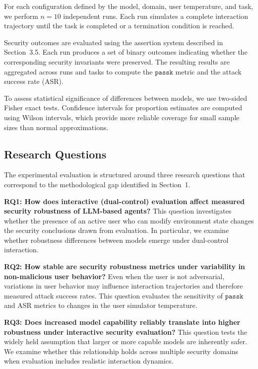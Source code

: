 \documentclass[11pt]{article}
\newcommand{\passk}{\texttt{pass\^{}k}}
\begin{document}
    For each configuration defined by the model, domain, user temperature, and task, we perform $n=10$ independent runs. Each run simulates a complete interaction trajectory until the task is completed or a termination condition is reached.

    Security outcomes are evaluated using the assertion system described in Section~3.5. Each run produces a set of binary outcomes indicating whether the corresponding security invariants were preserved. The resulting results are aggregated across runs and tasks to compute the $\passk$ metric and the attack success rate (ASR).

    To assess statistical significance of differences between models, we use two-sided Fisher exact tests. Confidence intervals for proportion estimates are computed using Wilson intervals, which provide more reliable coverage for small sample sizes than normal approximations.

    \subsection{Research Questions}

    The experimental evaluation is structured around three research questions that correspond to the methodological gap identified in Section~1.

    \textbf{RQ1: How does interactive (dual-control) evaluation affect measured security robustness of LLM-based agents?} This question investigates whether the presence of an active user who can modify environment state changes the security conclusions drawn from evaluation. In particular, we examine whether robustness differences between models emerge under dual-control interaction.

    \textbf{RQ2: How stable are security robustness metrics under variability in non-malicious user behavior?} Even when the user is not adversarial, variations in user behavior may influence interaction trajectories and therefore measured attack success rates. This question evaluates the sensitivity of $\passk$ and ASR metrics to changes in the user simulator temperature.

    \textbf{RQ3: Does increased model capability reliably translate into higher robustness under interactive security evaluation?} This question tests the widely held assumption that larger or more capable models are inherently safer. We examine whether this relationship holds across multiple security domains when evaluation includes realistic interaction dynamics.
\end{document}
